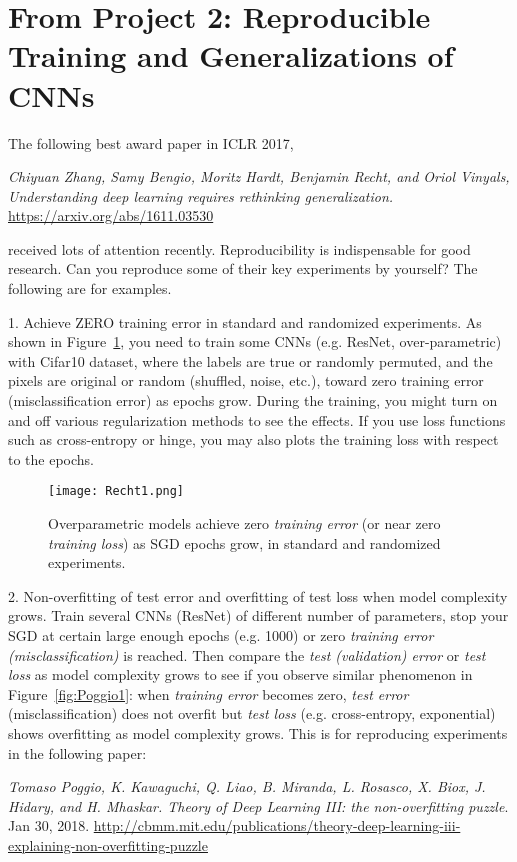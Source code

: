 \documentclass[11pt]{article}
\begin{document}
\section{From Project 2: Reproducible Training and Generalizations of CNNs} 

The following best award paper in ICLR 2017, 

\emph{Chiyuan Zhang, Samy Bengio, Moritz Hardt, Benjamin Recht, and Oriol Vinyals, Understanding deep learning requires rethinking generalization.} \url{https://arxiv.org/abs/1611.03530}

\noindent received lots of attention recently. Reproducibility is indispensable for good research. Can you reproduce some of their key experiments by yourself? The following are for examples. 

1. Achieve ZERO training error in standard and randomized experiments. As shown in Figure~\ref{fig:Recht1}, you need to train some CNNs (e.g. ResNet, over-parametric) with Cifar10 dataset, where the labels are true or randomly permuted, and the pixels are original or random (shuffled, noise, etc.), toward zero training error (misclassification error) as epochs grow. During the training, you might turn on and off various regularization methods to see the effects. If you use loss functions such as cross-entropy or hinge, you may also plots the training loss with respect to the epochs. 
\begin{figure}
\center
\texttt{[image: Recht1.png]}  
\caption{Overparametric models achieve zero \emph{training error} (or near zero \emph{training loss}) as SGD epochs grow, in standard and randomized experiments.}
\label{fig:Recht1}
\end{figure}

2. Non-overfitting of test error and overfitting of test loss when model complexity grows. Train several CNNs (ResNet) of different number of parameters, stop your SGD at certain large enough epochs (e.g. 1000) or zero \emph{training error (misclassification)} is reached. Then compare the \emph{test (validation) error} or \emph{test loss} as model complexity grows to see if you observe similar phenomenon in Figure~\ref{fig:Poggio1}: when \emph{training error} becomes zero, \emph{test error} (misclassification) does not overfit but \emph{test loss} (e.g. cross-entropy, exponential) shows overfitting as model complexity grows. This is for reproducing experiments in the following paper: 

\emph{Tomaso Poggio, K. Kawaguchi, Q. Liao, B. Miranda, L. Rosasco, X. Biox, J. Hidary, and H. Mhaskar. Theory of Deep Learning III: the non-overfitting puzzle}. Jan 30, 2018. \url{http://cbmm.mit.edu/publications/theory-deep-learning-iii-explaining-non-overfitting-puzzle} 
\end{document}
